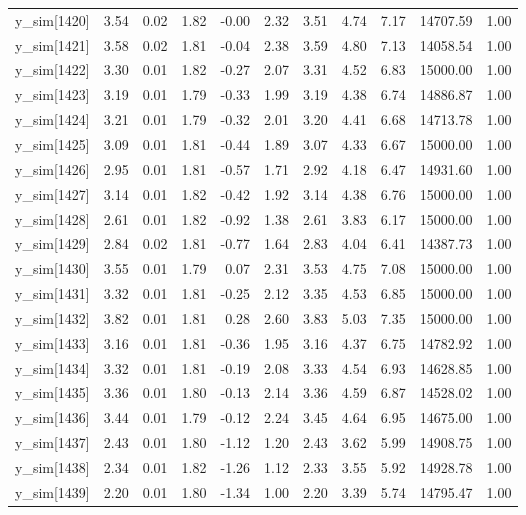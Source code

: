 \begin{table}[ht]
\begin{tabular}{rrrrrrrrrrr}
  y\_sim[1420] & 3.54 & 0.02 & 1.82 & -0.00 & 2.32 & 3.51 & 4.74 & 7.17 & 14707.59 & 1.00 \\ 
  y\_sim[1421] & 3.58 & 0.02 & 1.81 & -0.04 & 2.38 & 3.59 & 4.80 & 7.13 & 14058.54 & 1.00 \\ 
  y\_sim[1422] & 3.30 & 0.01 & 1.82 & -0.27 & 2.07 & 3.31 & 4.52 & 6.83 & 15000.00 & 1.00 \\ 
  y\_sim[1423] & 3.19 & 0.01 & 1.79 & -0.33 & 1.99 & 3.19 & 4.38 & 6.74 & 14886.87 & 1.00 \\ 
  y\_sim[1424] & 3.21 & 0.01 & 1.79 & -0.32 & 2.01 & 3.20 & 4.41 & 6.68 & 14713.78 & 1.00 \\ 
  y\_sim[1425] & 3.09 & 0.01 & 1.81 & -0.44 & 1.89 & 3.07 & 4.33 & 6.67 & 15000.00 & 1.00 \\ 
  y\_sim[1426] & 2.95 & 0.01 & 1.81 & -0.57 & 1.71 & 2.92 & 4.18 & 6.47 & 14931.60 & 1.00 \\ 
  y\_sim[1427] & 3.14 & 0.01 & 1.82 & -0.42 & 1.92 & 3.14 & 4.38 & 6.76 & 15000.00 & 1.00 \\ 
  y\_sim[1428] & 2.61 & 0.01 & 1.82 & -0.92 & 1.38 & 2.61 & 3.83 & 6.17 & 15000.00 & 1.00 \\ 
  y\_sim[1429] & 2.84 & 0.02 & 1.81 & -0.77 & 1.64 & 2.83 & 4.04 & 6.41 & 14387.73 & 1.00 \\ 
  y\_sim[1430] & 3.55 & 0.01 & 1.79 & 0.07 & 2.31 & 3.53 & 4.75 & 7.08 & 15000.00 & 1.00 \\ 
  y\_sim[1431] & 3.32 & 0.01 & 1.81 & -0.25 & 2.12 & 3.35 & 4.53 & 6.85 & 15000.00 & 1.00 \\ 
  y\_sim[1432] & 3.82 & 0.01 & 1.81 & 0.28 & 2.60 & 3.83 & 5.03 & 7.35 & 15000.00 & 1.00 \\ 
  y\_sim[1433] & 3.16 & 0.01 & 1.81 & -0.36 & 1.95 & 3.16 & 4.37 & 6.75 & 14782.92 & 1.00 \\ 
  y\_sim[1434] & 3.32 & 0.01 & 1.81 & -0.19 & 2.08 & 3.33 & 4.54 & 6.93 & 14628.85 & 1.00 \\ 
  y\_sim[1435] & 3.36 & 0.01 & 1.80 & -0.13 & 2.14 & 3.36 & 4.59 & 6.87 & 14528.02 & 1.00 \\ 
  y\_sim[1436] & 3.44 & 0.01 & 1.79 & -0.12 & 2.24 & 3.45 & 4.64 & 6.95 & 14675.00 & 1.00 \\ 
  y\_sim[1437] & 2.43 & 0.01 & 1.80 & -1.12 & 1.20 & 2.43 & 3.62 & 5.99 & 14908.75 & 1.00 \\ 
  y\_sim[1438] & 2.34 & 0.01 & 1.82 & -1.26 & 1.12 & 2.33 & 3.55 & 5.92 & 14928.78 & 1.00 \\ 
  y\_sim[1439] & 2.20 & 0.01 & 1.80 & -1.34 & 1.00 & 2.20 & 3.39 & 5.74 & 14795.47 & 1.00 \\ 

\end{tabular}
\end{table}

